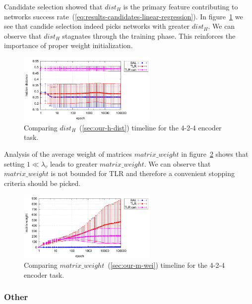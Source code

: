 Candidate selection showed that $dist_{H}$ is the primary feature contributing to networks success rate~(\ref{eq:results-candidates-linear-regression}). In figure~\ref{fig:results-candidates-h-dist} we see that candide selection indeed picks networks with greater $dist_{H}$. We can observe that $dist_{H}$ stagnates through the training phase. This reinforces the importance of proper weight initialization. 

\begin{figure}[H]
  \centering
  \includegraphics[width=0.6\textwidth]{img/feature-cmp-h-dist.pdf}  
   \caption{Comparing $dist_{H}$~(\ref{sec:our-h-dist}) timeline for the {4-2-4 encoder} task.}
  \label{fig:results-candidates-h-dist}
\end{figure}

Analysis of the average weight of matrices $matrix\_weight$ in figure~\ref{fig:results-candidates-m-wei} shows that setting $1 \ll \lambda_v$ leads to greater $matrix\_weight$. We can observe that $matrix\_weight$ is not bounded for TLR and therefore a convenient stopping criteria should be picked. 

\begin{figure}[H]
  \centering
  \includegraphics[width=0.6\textwidth]{img/feature-cmp-m-wei.pdf}  
   \caption{Comparing $matrix\_weight$~(\ref{sec:our-m-wei}) timeline for the {4-2-4 encoder} task.}
  \label{fig:results-candidates-m-wei}
\end{figure}


\subsubsection{Other}

